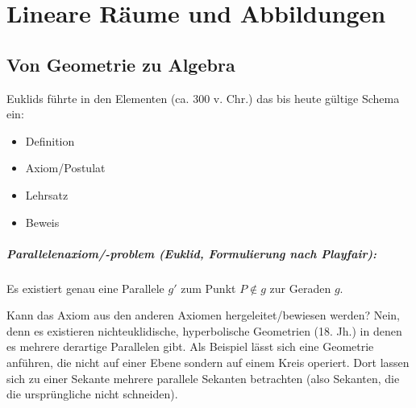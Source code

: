 \chapter{Lineare Räume und Abbildungen}
\section{Von Geometrie zu Algebra}
	Euklids führte in den \glqq Elementen\grqq{} (ca. 300 v. Chr.) das bis heute gültige Schema ein:
	\begin{itemize}
		\item Definition
		\item Axiom/Postulat
		\item Lehrsatz
		\item Beweis
	\end{itemize}

\paragraph{Parallelenaxiom/-problem (Euklid, Formulierung nach Playfair):}
	Es existiert genau eine Parallele $ g' $ zum Punkt $ P \notin g $ zur Geraden $ g $.

	Kann das Axiom aus den anderen Axiomen hergeleitet/bewiesen werden? Nein, denn es existieren nichteuklidische, hyperbolische Geometrien (18. Jh.) in denen es mehrere derartige Parallelen gibt. Als Beispiel lässt sich eine Geometrie anführen, die nicht auf einer Ebene sondern auf einem Kreis operiert. Dort lassen sich zu einer Sekante mehrere parallele Sekanten betrachten (also Sekanten, die die ursprüngliche nicht schneiden).

